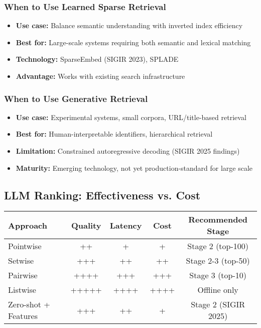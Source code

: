 \documentclass[11pt,letterpaper]{article}
\begin{document}
\subsubsection{When to Use Learned Sparse Retrieval}
\begin{itemize}[leftmargin=*]
    \item \textbf{Use case:} Balance semantic understanding with inverted index efficiency
    \item \textbf{Best for:} Large-scale systems requiring both semantic and lexical matching
    \item \textbf{Technology:} SparseEmbed (SIGIR 2023), SPLADE
    \item \textbf{Advantage:} Works with existing search infrastructure
\end{itemize}

\subsubsection{When to Use Generative Retrieval}
\begin{itemize}[leftmargin=*]
    \item \textbf{Use case:} Experimental systems, small corpora, URL/title-based retrieval
    \item \textbf{Best for:} Human-interpretable identifiers, hierarchical retrieval
    \item \textbf{Limitation:} Constrained autoregressive decoding (SIGIR 2025 findings)
    \item \textbf{Maturity:} Emerging technology, not yet production-standard for large scale
\end{itemize}

\subsection{LLM Ranking: Effectiveness vs. Cost}

\begin{center}
\begin{tabular}{|l|c|c|c|c|}
\hline
\textbf{Approach} & \textbf{Quality} & \textbf{Latency} & \textbf{Cost} & \textbf{Recommended Stage} \\
\hline
Pointwise & ++ & + & + & Stage 2 (top-100) \\
Setwise & +++ & ++ & ++ & Stage 2-3 (top-50) \\
Pairwise & ++++ & +++ & +++ & Stage 3 (top-10) \\
Listwise & +++++ & ++++ & ++++ & Offline only \\
\hline
Zero-shot + Features & +++ & ++ & + & Stage 2 (SIGIR 2025) \\
\hline
\end{tabular}
\end{center}
\end{document}
